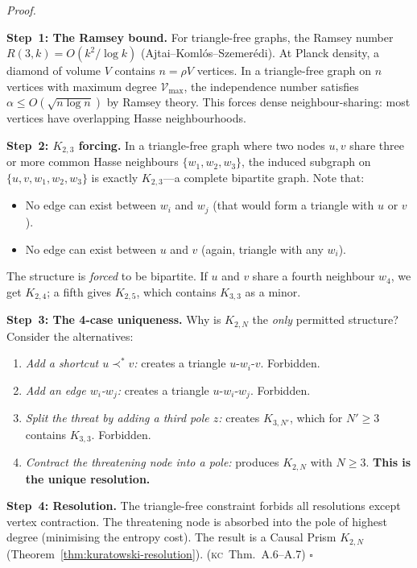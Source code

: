 \documentclass[11pt, a4paper, openany]{book}
\newcommand{\covers}{\prec^*}              %
\newcommand{\KC}[1]{\textnormal{(\textsc{kc}~#1)}}
\newcounter{thm}[chapter]
\renewenvironment{proof}[1][Proof]{%
  \par\noindent\textit{#1.}\quad
}{\hfill$\square$\par\medskip}
\begin{document}
\begin{proof}
\textbf{Step~1: The Ramsey bound.} For triangle-free graphs, the Ramsey
number $R(3,k) = O(k^2/\log k)$ (Ajtai--Koml\'os--Szemer\'edi). At
Planck density, a diamond of volume $V$ contains $n = \rho V$ vertices.
In a triangle-free graph on $n$ vertices with maximum degree $\mathcal{V}_{\max}$,
the independence number satisfies $\alpha \le O(\sqrt{n\log n})$ by
Ramsey theory. This forces dense neighbour-sharing: most vertices have
overlapping Hasse neighbourhoods.

\textbf{Step~2: $K_{2,3}$ forcing.} In a triangle-free graph where two
nodes $u, v$ share three or more common Hasse neighbours
$\{w_1, w_2, w_3\}$, the induced subgraph on
$\{u, v, w_1, w_2, w_3\}$ is exactly $K_{2,3}$---a complete bipartite
graph. Note that:
\begin{itemize}
  \item No edge can exist between $w_i$ and $w_j$ (that would form a
    triangle with $u$ or $v$).
  \item No edge can exist between $u$ and $v$ (again, triangle with
    any $w_i$).
\end{itemize}
The structure is \emph{forced} to be bipartite. If $u$ and $v$ share
a fourth neighbour $w_4$, we get $K_{2,4}$; a fifth gives $K_{2,5}$,
which contains $K_{3,3}$ as a minor.

\textbf{Step~3: The 4-case uniqueness.} Why is $K_{2,N}$ the
\emph{only} permitted structure? Consider the alternatives:
\begin{enumerate}
  \item \emph{Add a shortcut $u \covers v$:} creates a triangle
    $u$-$w_i$-$v$. Forbidden.
  \item \emph{Add an edge $w_i$-$w_j$:} creates a triangle
    $u$-$w_i$-$w_j$. Forbidden.
  \item \emph{Split the threat by adding a third pole $z$:} creates
    $K_{3,N'}$, which for $N' \ge 3$ contains $K_{3,3}$. Forbidden.
  \item \emph{Contract the threatening node into a pole:} produces
    $K_{2,N}$ with $N \ge 3$. \textbf{This is the unique resolution.}
\end{enumerate}

\textbf{Step~4: Resolution.} The triangle-free constraint forbids
all resolutions except vertex contraction. The threatening node is
absorbed into the pole of highest degree (minimising the entropy
cost). The result is a Causal Prism $K_{2,N}$
(Theorem~\ref{thm:kuratowski-resolution}). \KC{Thm.~A.6--A.7}
\end{proof}
\end{document}
